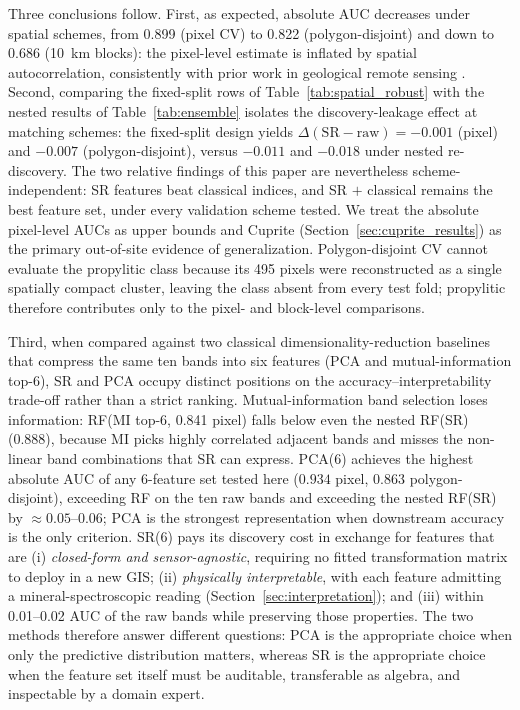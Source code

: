 \documentclass[preprint,authoryear,number]{elsarticle}
\begin{document}
Three conclusions follow. First, as expected, absolute AUC decreases under spatial schemes, from 0.899 (pixel CV) to 0.822 (polygon-disjoint) and down to 0.686 (\SI{10}{\kilo\meter} blocks): the pixel-level estimate is inflated by spatial autocorrelation, consistently with prior work in geological remote sensing \citep{Ploton2020}. Second, comparing the fixed-split rows of Table~\ref{tab:spatial_robust} with the nested results of Table~\ref{tab:ensemble} isolates the discovery-leakage effect at matching schemes: the fixed-split design yields $\Delta(\mathrm{SR}-\mathrm{raw}) = -0.001$ (pixel) and $-0.007$ (polygon-disjoint), versus $-0.011$ and $-0.018$ under nested re-discovery. The two relative findings of this paper are nevertheless scheme-independent: SR features beat classical indices, and SR $+$ classical remains the best feature set, under every validation scheme tested. We treat the absolute pixel-level AUCs as upper bounds and Cuprite (Section~\ref{sec:cuprite_results}) as the primary out-of-site evidence of generalization. Polygon-disjoint CV cannot evaluate the propylitic class because its 495 pixels were reconstructed as a single spatially compact cluster, leaving the class absent from every test fold; propylitic therefore contributes only to the pixel- and block-level comparisons.

Third, when compared against two classical dimensionality-reduction baselines that compress the same ten bands into six features (PCA and mutual-information top-6), SR and PCA occupy distinct positions on the accuracy--interpretability trade-off rather than a strict ranking. Mutual-information band selection loses information: RF(MI top-6, 0.841 pixel) falls below even the nested RF(SR) (0.888), because MI picks highly correlated adjacent bands and misses the non-linear band combinations that SR can express. PCA(6) achieves the highest absolute AUC of any 6-feature set tested here ($0.934$ pixel, $0.863$ polygon-disjoint), exceeding RF on the ten raw bands and exceeding the nested RF(SR) by $\approx 0.05$--$0.06$; PCA is the strongest representation when downstream accuracy is the only criterion. SR(6) pays its discovery cost in exchange for features that are (i) \emph{closed-form and sensor-agnostic}, requiring no fitted transformation matrix to deploy in a new GIS; (ii) \emph{physically interpretable}, with each feature admitting a mineral-spectroscopic reading (Section~\ref{sec:interpretation}); and (iii) within 0.01--0.02 AUC of the raw bands while preserving those properties. The two methods therefore answer different questions: PCA is the appropriate choice when only the predictive distribution matters, whereas SR is the appropriate choice when the feature set itself must be auditable, transferable as algebra, and inspectable by a domain expert.
\end{document}
